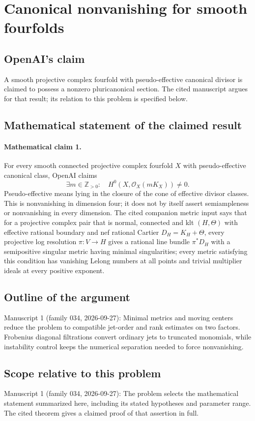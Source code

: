 \documentclass[11pt]{article}
\begin{document}
\section*{Canonical nonvanishing for smooth fourfolds}

\subsection{OpenAI's claim}
A smooth projective complex fourfold with pseudo-effective canonical divisor is claimed to possess a nonzero pluricanonical section. The cited manuscript argues for that result; its relation to this problem is specified below.

\subsection{Mathematical statement of the claimed result}
\paragraph{Mathematical claim 1.} For every smooth connected projective complex fourfold $X$ with pseudo-effective canonical class, OpenAI claims
\[
\exists m\in\mathbb Z_{>0}:\quad H^0(X,\mathcal O_X(mK_X))\ne0.
\]
Pseudo-effective means lying in the closure of the cone of effective divisor classes. This is nonvanishing in dimension four; it does not by itself assert semiampleness or nonvanishing in every dimension.
The cited companion metric input says that for a projective complex pair that is normal, connected and klt $(H,\Theta)$ with effective rational boundary and nef rational Cartier $D_H=K_H+\Theta$, every projective log resolution $\pi:V\to H$ gives a rational line bundle $\pi^*D_H$ with a semipositive singular metric having minimal singularities; every metric satisfying this condition has vanishing Lelong numbers at all points and trivial multiplier ideals at every positive exponent.

\subsection{Outline of the argument}
Manuscript 1 (family 034, 2026-09-27): Minimal metrics and moving centers reduce the problem to compatible jet-order and rank estimates on two factors. Frobenius diagonal filtrations convert ordinary jets to truncated monomials, while instability control keeps the numerical separation needed to force nonvanishing.

\subsection{Scope relative to this problem}
Manuscript 1 (family 034, 2026-09-27): The problem selects the mathematical statement summarized here, including its stated hypotheses and parameter range. The cited theorem gives a claimed proof of that assertion in full.
\end{document}
